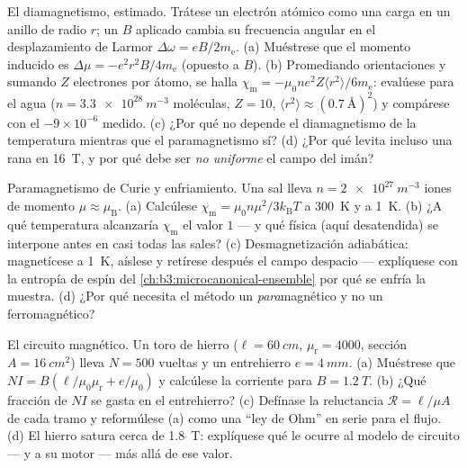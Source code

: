 \begin{exercise}[$\star\star$]\label{exo:b3:electromagnetism-in-matter:8}
El diamagnetismo, estimado. Trátese un electrón atómico como una carga en un
anillo de radio $r$; un $B$ aplicado cambia su frecuencia angular en
el desplazamiento de Larmor $\Delta\omega = eB/2m_{\text{e}}$. (a) Muéstrese que el
momento inducido es $\Delta\mu = -e^2r^2B/4m_{\text{e}}$ (opuesto a
$B$). (b) Promediando orientaciones y sumando $Z$ electrones por
átomo, se halla $\chi_{\text{m}} = -\mu_0ne^2Z\langle
r^2\rangle/6m_{\text{e}}$: evalúese para el agua ($n =
\qty{3.3e28}{m^{-3}}$ moléculas, $Z = 10$, $\langle r^2\rangle
\approx (\qty{0.7}{\angstrom})^2$) y compárese con el
$-9\times10^{-6}$ medido. (c) ¿Por qué no depende el diamagnetismo de la temperatura
mientras que el paramagnetismo sí? (d) ¿Por qué levita incluso una rana en
\qty{16}{T}, y por qué debe ser \emph{no uniforme} el campo del imán?
\end{exercise}

\begin{exercise}[$\star\star$]\label{exo:b3:electromagnetism-in-matter:9}
Paramagnetismo de Curie y enfriamiento. Una sal lleva $n =
\qty{2e27}{m^{-3}}$ iones de momento $\mu \approx \mu_{\text{B}}$.
(a) Calcúlese $\chi_{\text{m}} = \mu_0n\mu^2/3k_{\text{B}}T$ a
\qty{300}{K} y a \qty{1}{K}. (b) ¿A qué temperatura alcanzaría
$\chi_{\text{m}}$ el valor $1$ --- y qué física (aquí desatendida)
se interpone antes en casi todas las sales? (c) Desmagnetización adiabática:
magnetícese a \qty{1}{K}, aíslese y retírese después el campo despacio ---
explíquese con la entropía de espín del
\cref{ch:b3:microcanonical-ensemble} por qué se enfría la muestra. (d) ¿Por qué
necesita el método un \emph{para}magnético y no un ferromagnético?
\end{exercise}

\begin{exercise}[$\star\star\star$]\label{exo:b3:electromagnetism-in-matter:10}
El circuito magnético. Un toro de hierro ($\ell = \qty{60}{cm}$,
$\mu_{\text{r}} = 4000$, sección $A = \qty{16}{cm^2}$) lleva
$N = 500$ vueltas y un entrehierro $e = \qty{4}{mm}$. (a) Muéstrese que $NI =
B(\ell/\mu_0\mu_{\text{r}} + e/\mu_0)$ y calcúlese la corriente para
$B = \qty{1.2}{T}$. (b) ¿Qué fracción de $NI$ se gasta en el entrehierro?
(c) Defínase la reluctancia $\mathcal R = \ell/\mu A$ de cada
tramo y reformúlese (a) como una ``ley de Ohm'' en serie para el flujo. (d)
El hierro satura cerca de \qty{1.8}{T}: explíquese qué le ocurre al
modelo de circuito --- y a su motor --- más allá de ese valor.
\end{exercise}

